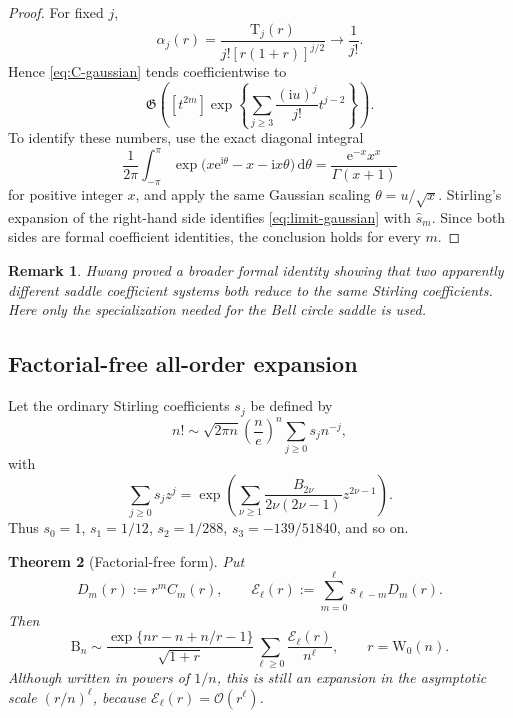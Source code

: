 \documentclass[11pt,a4paper]{article}
\newtheorem{theorem}{Theorem}[section]
\newtheorem{remark}[theorem]{Remark}
\theoremstyle{definition}
\newcommand{\Bell}{\mathrm B}
\newcommand{\Touch}{\mathrm T}
\newcommand{\W}{\mathrm W}
\newcommand{\ee}{\mathrm e}
\newcommand{\ii}{\mathrm i}
\newcommand{\dd}{\,\mathrm d}
\newcommand{\Gaus}{\mathfrak G}
\newcommand{\cE}{\mathcal E}
\newcommand{\bigO}{\mathcal O}
\begin{document}
\begin{proof}
For fixed $j$,
\[
 \alpha_j(r)=\frac{\Touch_j(r)}{j![r(1+r)]^{j/2}}
 \longrightarrow\frac1{j!}.
\]
Hence \eqref{eq:C-gaussian} tends coefficientwise to
\begin{equation}\label{eq:limit-gaussian}
 \Gaus\!\left([t^{2m}]
 \exp\!\left\{\sum_{j\ge3}\frac{(\ii u)^j}{j!}t^{j-2}\right\}\right).
\end{equation}
To identify these numbers, use the exact diagonal integral
\begin{equation}\label{eq:poisson-diagonal}
 \frac1{2\pi}\int_{-\pi}^{\pi}
 \exp\!\bigl(x\ee^{\ii\theta}-x-\ii x\theta\bigr)\dd\theta
 =\frac{\ee^{-x}x^x}{\Gamma(x+1)}
\end{equation}
for positive integer $x$, and apply the same Gaussian scaling
$\theta=u/\sqrt{x}$.  Stirling's expansion of the right-hand side identifies
\eqref{eq:limit-gaussian} with $\widehat s_m$.  Since both sides are formal
coefficient identities, the conclusion holds for every $m$.
\end{proof}

\begin{remark}
Hwang proved a broader formal identity showing that two apparently different
saddle coefficient systems both reduce to the same Stirling coefficients.
Here only the specialization needed for the Bell circle saddle is used.
\end{remark}

\subsection{Factorial-free all-order expansion}

Let the ordinary Stirling coefficients $s_j$ be defined by
\begin{equation}\label{eq:stirling-series}
 n!\sim\sqrt{2\pi n}\left(\frac ne\right)^n
 \sum_{j\ge0}s_jn^{-j},
\end{equation}
with
\begin{equation}\label{eq:stirling-gen}
 \sum_{j\ge0}s_jz^j
 =\exp\!\left(
 \sum_{\nu\ge1}
 \frac{B_{2\nu}}{2\nu(2\nu-1)}z^{2\nu-1}
 \right).
\end{equation}
Thus $s_0=1$, $s_1=1/12$, $s_2=1/288$,
$s_3=-139/51840$, and so on.

\begin{theorem}[Factorial-free form]\label{thm:factorial-free}
Put
\begin{equation}\label{eq:Dm}
 D_m(r):=r^mC_m(r),
 \qquad
 \cE_\ell(r):=\sum_{m=0}^{\ell}s_{\ell-m}D_m(r).
\end{equation}
Then
\begin{equation}\label{eq:factorial-free}
 \Bell_n\sim
 \frac{\exp\{nr-n+n/r-1\}}{\sqrt{1+r}}
 \sum_{\ell\ge0}\frac{\cE_\ell(r)}{n^\ell},
 \qquad r=\W_0(n).
\end{equation}
Although written in powers of $1/n$, this is still an expansion in the
asymptotic scale $(r/n)^\ell$, because $\cE_\ell(r)=\bigO(r^\ell)$.
\end{theorem}
\end{document}
